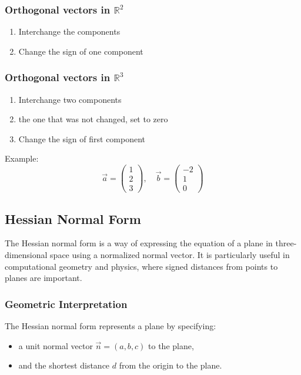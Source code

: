 \subsubsection{Orthogonal vectors in \texorpdfstring{\(\mathbb{R}^2\)}{}}

\begin{enumerate}
	\item Interchange the components
	\item Change the sign of one component
\end{enumerate}

\subsubsection{Orthogonal vectors in \texorpdfstring{\(\mathbb{R}^3\)}{}}
\begin{enumerate}
	\item Interchange two components
	\item the one that was not changed, set to zero
	\item Change the sign of first component
\end{enumerate}
 Example:
\[
	\vec{a} = \begin{pmatrix} 1 \\ 2 \\ 3 \end{pmatrix}, \quad \vec{b} = \begin{pmatrix} -2 \\ 1 \\ 0 \end{pmatrix}
\]

\subsection{Hessian Normal Form}

The Hessian normal form is a way of expressing the equation of a plane in three-dimensional space using a normalized normal vector. It is particularly useful in computational geometry and physics, where signed distances from points to planes are important.

\subsubsection*{Geometric Interpretation}

The Hessian normal form represents a plane by specifying:
\begin{itemize}[label=\(-\)]
	\item a unit normal vector \(\vec{n} = (a, b, c)\) to the plane,
	\item and the shortest distance \(d\) from the origin to the plane.
\end{itemize}

